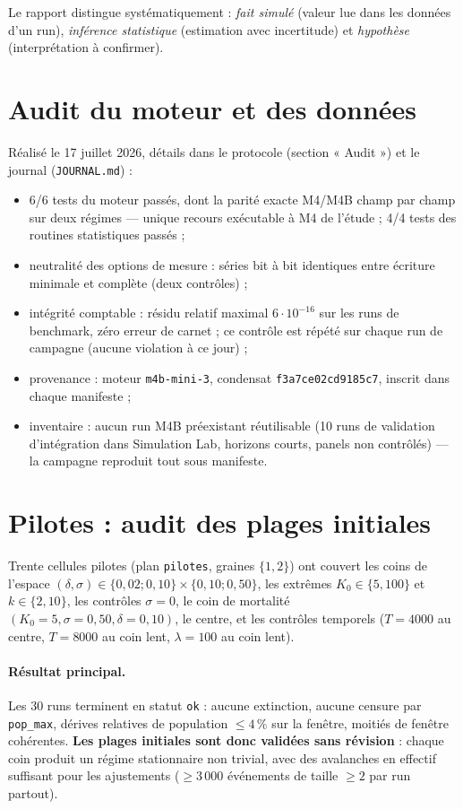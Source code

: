 \documentclass[11pt,a4paper]{article}
\newcommand{\code}[1]{\texttt{#1}}
\begin{document}
Le rapport distingue systématiquement : \emph{fait simulé} (valeur lue
dans les données d'un run), \emph{inférence statistique} (estimation avec
incertitude) et \emph{hypothèse} (interprétation à confirmer).

\section{Audit du moteur et des données}
\label{sec:audit}

Réalisé le 17 juillet 2026, détails dans le protocole
(section « Audit ») et le journal (\code{JOURNAL.md}) :

\begin{itemize}
\item 6/6 tests du moteur passés, dont la parité exacte M4/M4B champ par
  champ sur deux régimes — unique recours exécutable à M4 de l'étude ;
  4/4 tests des routines statistiques passés ;
\item neutralité des options de mesure : séries bit à bit identiques
  entre écriture minimale et complète (deux contrôles) ;
\item intégrité comptable : résidu relatif maximal $6\cdot10^{-16}$ sur
  les runs de benchmark, zéro erreur de carnet ; ce contrôle est répété
  sur chaque run de campagne (aucune violation à ce jour) ;
\item provenance : moteur \code{m4b-mini-3}, condensat
  \code{f3a7ce02cd9185c7}, inscrit dans chaque manifeste ;
\item inventaire : aucun run M4B préexistant réutilisable (10 runs de
  validation d'intégration dans Simulation Lab, horizons courts, panels
  non contrôlés) — la campagne reproduit tout sous manifeste.
\end{itemize}

\section{Pilotes : audit des plages initiales}
\label{sec:pilotes}

Trente cellules pilotes (plan \code{pilotes}, graines $\{1,2\}$) ont
couvert les coins de l'espace
$(\delta,\sigma)\in\{0{,}02;0{,}10\}\times\{0{,}10;0{,}50\}$, les
extrêmes $K_0\in\{5,100\}$ et $k\in\{2,10\}$, les contrôles $\sigma=0$,
le coin de mortalité $(K_0{=}5,\sigma{=}0{,}50,\delta{=}0{,}10)$, le
centre, et les contrôles temporels ($T=4000$ au centre, $T=8000$ au coin
lent, $\lambda=100$ au coin lent).

\paragraph{Résultat principal.} Les 30 runs terminent en statut
\code{ok} : aucune extinction, aucune censure par \code{pop\_max},
dérives relatives de population $\le 4\,\%$ sur la fenêtre, moitiés de
fenêtre cohérentes. \textbf{Les plages initiales sont donc validées sans
révision} : chaque coin produit un régime stationnaire non trivial, avec
des avalanches en effectif suffisant pour les ajustements
($\ge 3\,000$ événements de taille $\ge2$ par run partout).
\end{document}
